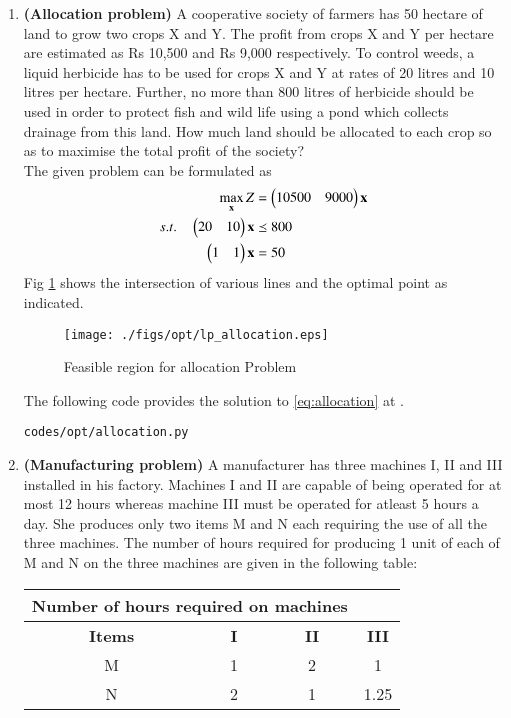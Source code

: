 \begin{enumerate}[label=\arabic*.,ref=\thesection.\theenumi]
\item \textbf{(Allocation problem)} A cooperative society of farmers has 50 hectare
of land to grow two crops X and Y. The profit from crops X and Y per hectare are
estimated as Rs 10,500 and Rs 9,000 respectively. To control weeds, a liquid herbicide
has to be used for crops X and Y at rates of 20 litres and 10 litres per hectare. Further,
no more than 800 litres of herbicide should be used in order to protect fish and wild life
using a pond which collects drainage from this land. How much land should be allocated
to each crop so as to maximise the total profit of the society?\\
\solution The given problem can be formulated as
\begin{align}
\max_{\mathbf{x}} Z &= \begin{pmatrix}10500 & 9000\end{pmatrix}\mathbf{x}
\\
s.t. \quad 
\begin{pmatrix}
20 & 10
\end{pmatrix}
\mathbf{x} & \preceq 800
\\
\begin{pmatrix}
1 & 1
\end{pmatrix} 
\mathbf{x} &= 50
\label{eq:allocation}
\end{align}
Fig  \ref{fig:allocation}
shows the intersection of various lines and the optimal point as indicated.
\begin{figure}[h]
\texttt{[image: ./figs/opt/lp\_allocation.eps]}
\caption{Feasible region for allocation Problem}
\caption{}
\label{fig:allocation}
\end{figure}

The following code provides the solution to \eqref{eq:allocation} at .
%
\begin{lstlisting}
codes/opt/allocation.py
\end{lstlisting}

\item \textbf{(Manufacturing problem)} A manufacturer has three machines I, II
and III installed in his factory. Machines I and II are capable of being operated for
at most 12 hours whereas machine III must be operated for atleast 5 hours a day. She
produces only two items M and N each requiring the use of all the three machines.
The number of hours required for producing 1 unit of each of M and N on the three
machines are given in the following table:\\

\begin{tabular}{|c|c|c|c|}
\hline
 \multicolumn{3}{|l}{\textbf{ Number of hours required on machines}}& \\ \cline{2-4}
\hline
\textbf {Items}&\textbf{I}&\textbf{II}&\textbf{III}\\
\hline
M&1&2&1\\
\hline
 N&2&1&1.25\\
 \hline 


\end{tabular}
\end{enumerate}
